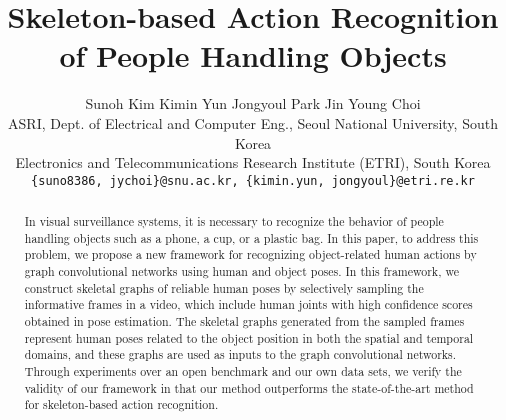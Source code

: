 \documentclass[10pt,twocolumn,letterpaper]{article}
\begin{document}
\title{Skeleton-based Action Recognition of People Handling Objects
}
\author{Sunoh Kim \hspace{1.5cm} Kimin Yun \hspace{1.5cm} Jongyoul Park \hspace{1.5cm} Jin Young Choi \\
ASRI, Dept. of Electrical and Computer Eng., Seoul National University, South Korea\\
Electronics and Telecommunications Research Institute (ETRI), South Korea\\
{\tt\small \{suno8386, jychoi\}@snu.ac.kr, \{kimin.yun, jongyoul\}@etri.re.kr}
}


\maketitle
\ifwacvfinal\thispagestyle{empty}\fi

\begin{abstract}
In visual surveillance systems, it is necessary to recognize the behavior of people handling objects such as a phone, a cup, or a plastic bag.
In this paper, to address this problem, we propose a new framework for recognizing object-related human actions by graph convolutional networks using human and object poses. 
In this framework, we construct skeletal graphs of reliable human poses by selectively sampling the informative frames in a video, which include human joints with high confidence scores obtained in pose estimation.
The skeletal graphs generated from the sampled frames represent human poses related to the object position in both the spatial and temporal domains, and these graphs are used as inputs to the graph convolutional networks.
Through experiments over an open benchmark and our own data sets, we verify the validity of our framework in that our method outperforms the state-of-the-art method for skeleton-based action recognition. 
\end{abstract}
\end{document}
